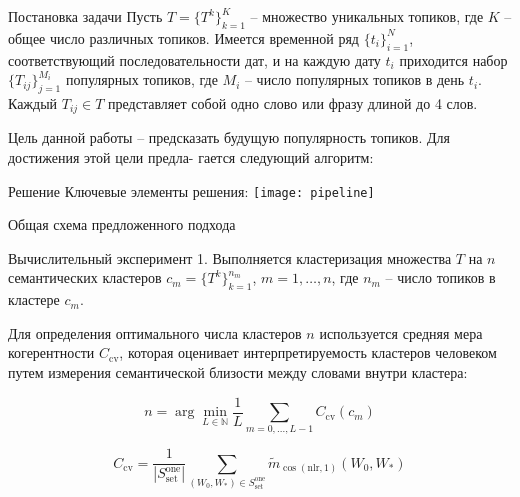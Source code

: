 \documentclass{beamer}
\begin{document}
\begin{frame}{Постановка задачи}
Пусть $T = \{T^k\}_{k=1}^K$ -- множество уникальных топиков, где $K$ -- общее число различных топиков. Имеется временной ряд $\{t_i\}_{i=1}^N$, соответствующий последовательности дат, и на каждую дату $t_i$ приходится набор $\{T_{ij}\}_{j=1}^{M_i}$ популярных топиков, где $M_i$ -- число популярных топиков в день $t_i$. Каждый $T_{ij} \in T$ представляет собой одно слово или фразу длиной до 4 слов.


Цель данной работы – предсказать будущую популярность топиков. Для достижения этой цели предла-
гается следующий алгоритм:
\end{frame}
\begin{frame}{Решение}
Ключевые элементы решения:
\centering
\texttt{[image: pipeline]}
\caption{Общая схема предложенного подхода}

\end{frame}
\begin{frame}{Вычислительный эксперимент}
1. Выполняется кластеризация множества $T$ на $n$ семантических кластеров $c_m = \{T^k\}_{k=1}^{n_m}$, $m = 1, \ldots, n$, где $n_m$ -- число топиков в кластере $c_m$. 

Для определения оптимального числа кластеров $n$ используется средняя мера когерентности $C_{\text{cv}}$, которая оценивает интерпретируемость кластеров человеком путем измерения семантической близости между словами внутри кластера:

\begin{equation}
n = \arg\min_{L \in \mathbb{N}} \frac{1}{L} \sum_{m=0,...,L-1} C_{\text{cv}}(c_m)
\end{equation}


\begin{equation}
C_{\text{cv}} = \frac{1}{|S^{\text{one}}_{\text{set}}|} \sum_{(W_0, W_*) \in S^{\text{one}}_{\text{set}}} \tilde{m}_{\cos(\text{nlr}, 1)}(W_0, W_*)
\end{equation}

\end{frame}
\end{document}

